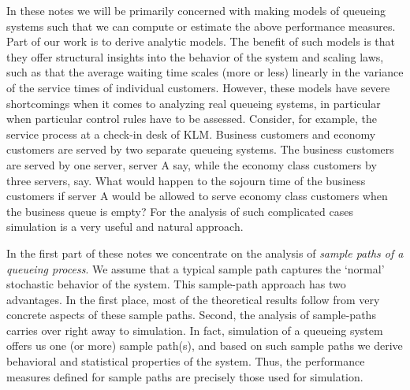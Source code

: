 In these notes we will be primarily concerned with making models of queueing systems such that we can compute or estimate the above performance measures.
Part of our work is to derive analytic models.
The benefit of such models is that they offer structural insights into the behavior of the system and scaling laws, such as that the average waiting time scales (more or less) linearly in the variance of the service times of individual customers.
However, these models have severe shortcomings when it comes to analyzing real queueing systems, in particular when particular control rules have to be assessed.
Consider, for example, the service process at a check-in desk of KLM.
Business customers and economy customers are served by two separate queueing systems.
The business customers are served by one server, server A say, while the economy class customers by three servers, say.
What would happen to the sojourn time of the business customers if server A would be allowed to serve economy class customers when the business queue is empty?
For the analysis of such complicated cases simulation is a very useful and natural approach.

In the first part of these notes we concentrate on the analysis of \emph{sample paths of a queueing process}.
We assume that a typical sample path captures the `normal' stochastic behavior of the system.
This sample-path approach has two advantages.
In the first place, most of the theoretical results follow from very concrete aspects of these sample paths.
Second, the analysis of sample-paths carries over right away to simulation.
In fact, simulation of a queueing system offers us one (or more) sample path(s), and based on such sample paths we derive behavioral and statistical properties of the system.
Thus, the performance measures defined for sample paths are precisely those used for simulation.

